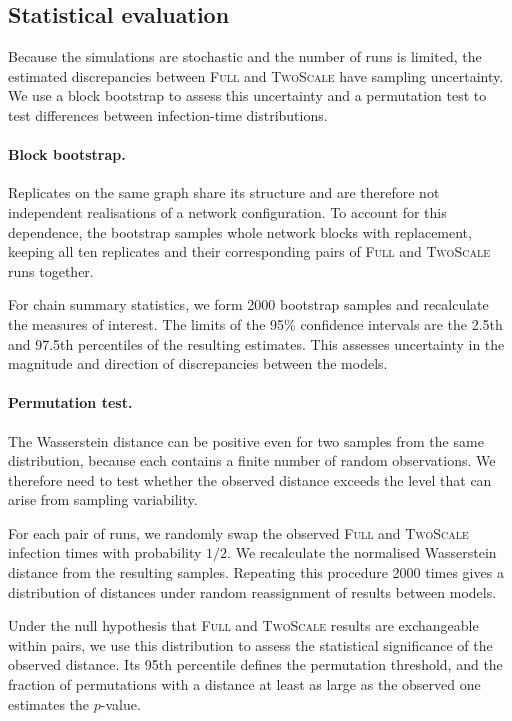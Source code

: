 \documentclass[a4paper,fleqn]{cas-sc}
\newcommand{\Full}{\textup{\textsc{Full}}}
\newcommand{\TS}{\textup{\textsc{TwoScale}}}
\begin{document}
\subsection{Statistical evaluation}

Because the simulations are stochastic and the number of runs is limited, the estimated discrepancies between \Full{} and \TS{} have sampling uncertainty. We use a block bootstrap to assess this uncertainty and a permutation test to test differences between infection-time distributions.

\paragraph{Block bootstrap.}
Replicates on the same graph share its structure and are therefore not independent realisations of a network configuration. To account for this dependence, the bootstrap samples whole network blocks with replacement, keeping all ten replicates and their corresponding pairs of \Full{} and \TS{} runs together.

For chain summary statistics, we form 2000 bootstrap samples and recalculate the measures of interest. The limits of the 95\% confidence intervals are the 2.5th and 97.5th percentiles of the resulting estimates. This assesses uncertainty in the magnitude and direction of discrepancies between the models.

\paragraph{Permutation test.}
The Wasserstein distance can be positive even for two samples from the same distribution, because each contains a finite number of random observations. We therefore need to test whether the observed distance exceeds the level that can arise from sampling variability.

For each pair of runs, we randomly swap the observed \Full{} and \TS{} infection times with probability $1/2$. We recalculate the normalised Wasserstein distance from the resulting samples. Repeating this procedure 2000 times gives a distribution of distances under random reassignment of results between models.

Under the null hypothesis that \Full{} and \TS{} results are exchangeable within pairs, we use this distribution to assess the statistical significance of the observed distance. Its 95th percentile defines the permutation threshold, and the fraction of permutations with a distance at least as large as the observed one estimates the $p$-value.
\end{document}
